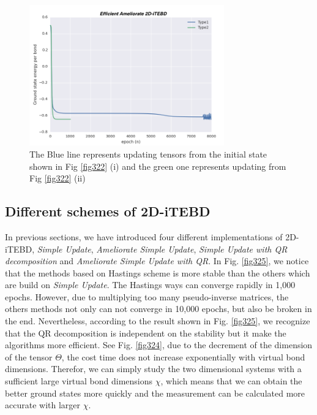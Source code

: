 \begin{figure}[ht]
	\centering
	\includegraphics[width=0.75\textwidth]{figures/fig323.png}
	\caption[Comparison the results of Heisenberg model on square lattice which are obtaining from different initial states.]{The Blue line represents updating tensors from the initial state shown in Fig \ref{fig322} (i) and the green one represents updating from Fig \ref{fig322} (ii)}
	\label{fig323}
\end{figure}

\subsection{Different schemes of 2D-iTEBD}

In previous sections, we have introduced four different implementations of 2D-iTEBD, \textit{Simple Update}, \textit{Ameliorate Simple Update}, \textit{Simple Update with QR decomposition} and \textit{Ameliorate Simple Update with QR}. In Fig. \ref{fig325}, we notice that the methods based on Hastings scheme is more stable than the others which are build on \textit{Simple Update}. The Hastings ways can converge rapidly in 1,000 epochs. However, due to multiplying too many pseudo-inverse matrices, the others methods not only can not converge in 10,000 epochs, but also be broken in the end. Nevertheless, according to the result shown in Fig. \ref{fig325}, we recognize that the QR decomposition is independent on the stability but it make the algorithms more efficient. See Fig. \ref{fig324}, due to the decrement of the dimension of the tensor $\Theta$, the cost time does not increase exponentially with virtual bond dimensions. Therefor, we can simply study the two dimensional systems with a sufficient large virtual bond dimensions $\chi$, which means that we can obtain the better ground states more quickly and the measurement can be calculated more accurate with larger $\chi$.

